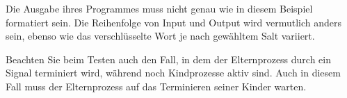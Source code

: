 Die Ausgabe ihres Programmes muss nicht genau wie in diesem Beispiel
formatiert sein. Die Reihenfolge von Input und Output wird vermutlich
anders sein, ebenso wie das verschlüsselte Wort je nach gewähltem Salt
variiert.

Beachten Sie beim Testen auch den Fall, in dem der Elternprozess durch
ein Signal terminiert wird, während noch Kindprozesse aktiv sind. Auch
in diesem Fall muss der Elternprozess auf das Terminieren seiner Kinder
warten.

\osueguidelinestwo


